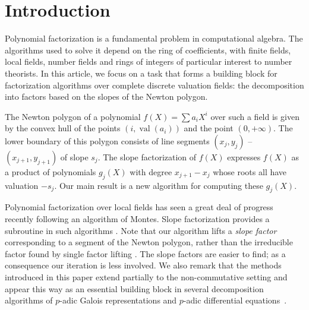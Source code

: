 \documentclass{sig-alternate-05-2015}
\DeclareMathOperator{\val}{val}
\newcommand{\RS}{\text{\rm RS}}
\begin{document}
%
%

\section{Introduction}

Polynomial factorization is a fundamental problem in computational algebra.
The algorithms used to solve it depend on the ring of coefficients, with finite fields,
local fields, number fields and rings of integers of particular interest to number theorists.
In this article, we focus on a task that forms a building block for factorization
algorithms over complete discrete valuation fields: the decomposition into factors based on the
slopes of the Newton polygon.

The Newton polygon of a polynomial $f(X) = \sum a_i X^i$ over such a field is given by
the convex hull of the points $(i, \val(a_i))$ and the point $(0, +\infty)$.  The lower
boundary of this polygon consists of line segments $(x_j,y_j)$ -- $(x_{j+1},y_{j+1})$
of slope $s_j$.  The slope factorization of $f(X)$ expresses $f(X)$ as a product
of polynomials $g_j(X)$ with degree $x_{j+1} - x_j$ whose roots all have valuation $-s_j$.
Our main result is a new algorithm for computing these $g_j(X)$.

Polynomial factorization over local fields has seen a great deal of progress recently
following an algorithm of Montes.  Slope factorization provides a subroutine
in such algorithms \cite[Section~2]{pauli:10a}.  Note that our algorithm lifts
a \emph{slope factor} corresponding to a segment of the Newton polygon,
rather than the irreducible factor found by single factor lifting \cite{guardia-nart-pauli:12a}.
The slope factors are easier to find; as a consequence our iteration is less involved.
We also remark that the methods introduced in this paper extend 
partially to the non-commutative setting and appear this way as an
essential building block in several decomposition algorithms of 
$p$-adic Galois representations and $p$-adic differential 
equations~\cite{caruso:16}.
\end{document}
